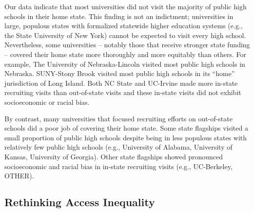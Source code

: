 \documentclass[twoside]{article}
\begin{document}
Our data indicate that most universities did not visit the majority of public high schools in their home state. This finding is not an indictment; universities in large, populous states with formalized statewide higher education systems (e.g., the State University of New York) cannot be expected to visit every high school. Nevertheless, some universities  -- notably those that receive stronger state funding -- covered their home state more thoroughly and more equitably than others.  For example, The University of Nebraska-Lincoln visited most public high schools in Nebraska. SUNY-Stony Brook visited most public high schools in its ``home'' jurisdiction of Long Island. Both NC State and UC-Irvine made more in-state recruiting visits than out-of-state visits and these in-state visits did not exhibit socioeconomic or racial bias.

By contrast, many universities that focused recruiting efforts on out-of-state schools did a poor job of covering their home state. Some state flagships visited a small proportion of public high schools despite being in less populous states with relatively few public high schools (e.g., University of Alabama, University of Kansas, University of Georgia).  Other state flagships showed pronounced socioeconomic and racial bias in in-state recruiting visits (e.g., UC-Berkeley, OTHER).

\subsection*{Rethinking Access Inequality}
\end{document}
